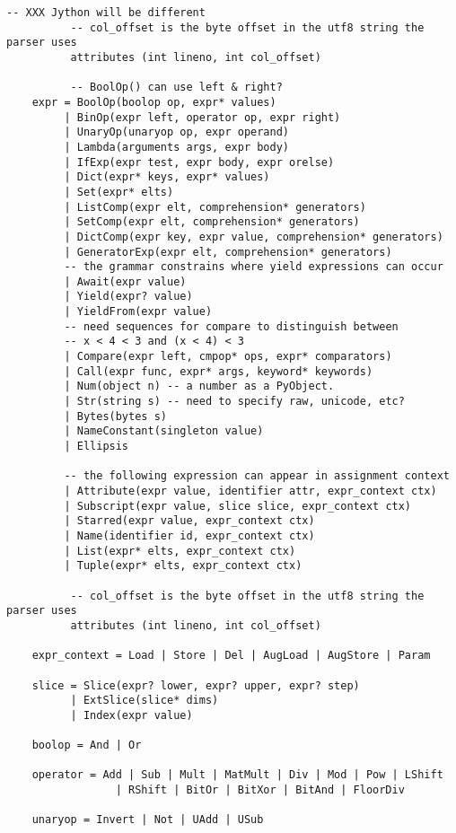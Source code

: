 \begin{lstlisting}[style=default, caption={The abstract syntax of Python}, label={python_abstract_syntax}, breaklines=true]
          -- XXX Jython will be different
          -- col_offset is the byte offset in the utf8 string the parser uses
          attributes (int lineno, int col_offset)

          -- BoolOp() can use left & right?
    expr = BoolOp(boolop op, expr* values)
         | BinOp(expr left, operator op, expr right)
         | UnaryOp(unaryop op, expr operand)
         | Lambda(arguments args, expr body)
         | IfExp(expr test, expr body, expr orelse)
         | Dict(expr* keys, expr* values)
         | Set(expr* elts)
         | ListComp(expr elt, comprehension* generators)
         | SetComp(expr elt, comprehension* generators)
         | DictComp(expr key, expr value, comprehension* generators)
         | GeneratorExp(expr elt, comprehension* generators)
         -- the grammar constrains where yield expressions can occur
         | Await(expr value)
         | Yield(expr? value)
         | YieldFrom(expr value)
         -- need sequences for compare to distinguish between
         -- x < 4 < 3 and (x < 4) < 3
         | Compare(expr left, cmpop* ops, expr* comparators)
         | Call(expr func, expr* args, keyword* keywords)
         | Num(object n) -- a number as a PyObject.
         | Str(string s) -- need to specify raw, unicode, etc?
         | Bytes(bytes s)
         | NameConstant(singleton value)
         | Ellipsis

         -- the following expression can appear in assignment context
         | Attribute(expr value, identifier attr, expr_context ctx)
         | Subscript(expr value, slice slice, expr_context ctx)
         | Starred(expr value, expr_context ctx)
         | Name(identifier id, expr_context ctx)
         | List(expr* elts, expr_context ctx)
         | Tuple(expr* elts, expr_context ctx)

          -- col_offset is the byte offset in the utf8 string the parser uses
          attributes (int lineno, int col_offset)

    expr_context = Load | Store | Del | AugLoad | AugStore | Param

    slice = Slice(expr? lower, expr? upper, expr? step)
          | ExtSlice(slice* dims)
          | Index(expr value)

    boolop = And | Or

    operator = Add | Sub | Mult | MatMult | Div | Mod | Pow | LShift
                 | RShift | BitOr | BitXor | BitAnd | FloorDiv

    unaryop = Invert | Not | UAdd | USub


\end{lstlisting}
